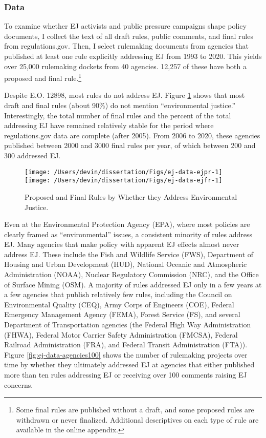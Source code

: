 \documentclass[
      12pt,
        ]{article}
\begin{document}
\hypertarget{data}{%
\subsubsection{Data}\label{data}}

To examine whether EJ activists and public pressure campaigns shape policy documents,
I collect the text of all draft rules, public comments, and final rules from regulations.gov. Then, I select rulemaking documents from agencies that published at least one rule explicitly addressing EJ from 1993 to 2020. This yields over 25,000 rulemaking dockets from 40 agencies. 12,257 of these have both a proposed and final rule.\footnote{Some final rules are published without a draft, and some proposed rules are withdrawn or never finalized. Additional descriptives on each type of rule are available in the online appendix.}

Despite E.O. 12898, most rules do not address EJ. Figure \ref{fig:ej-data} shows that most draft and final rules (about 90\%) do not mention ``environmental justice.'' Interestingly, the total number of final rules and the percent of the total addressing EJ have remained relatively stable for the period where regulations.gov data are complete (after 2005). From 2006 to 2020, these agencies published between 2000 and 3000 final rules per year, of which between 200 and 300 addressed EJ.

\begin{figure}

{\centering \texttt{[image: /Users/devin/dissertation/Figs/ej-data-ejpr-1]} \texttt{[image: /Users/devin/dissertation/Figs/ej-data-ejfr-1]} 

}

\caption{Proposed and Final Rules by Whether they Address Environmental Justice.}\label{fig:ej-data}
\end{figure}

Even at the Environmental Protection Agency (EPA), where most policies are clearly framed as ``environmental'' issues, a consistent minority of rules address EJ. Many agencies that make policy with apparent EJ effects almost never address EJ. These include the Fish and Wildlife Service (FWS), Department of Housing and Urban Development (HUD), National Oceanic and Atmospheric Administration (NOAA), Nuclear Regulatory Commission (NRC), and the Office of Surface Mining (OSM). A majority of rules addressed EJ only in a few years at a few agencies that publish relatively few rules, including the Council on Environmental Quality (CEQ), Army Corps of Engineers (COE), Federal Emergency Management Agency (FEMA), Forest Service (FS), and several Department of Transportation agencies (the Federal High Way Administration (FHWA), Federal Motor Carrier Safety Administration (FMCSA), Federal Railroad Administration (FRA), and Federal Transit Administration (FTA)). Figure \ref{fig:ej-data-agencies100} shows the number of rulemaking projects over time by whether they ultimately addressed EJ at agencies that either published more than ten rules addressing EJ or receiving over 100 comments raising EJ concerns.
\end{document}
